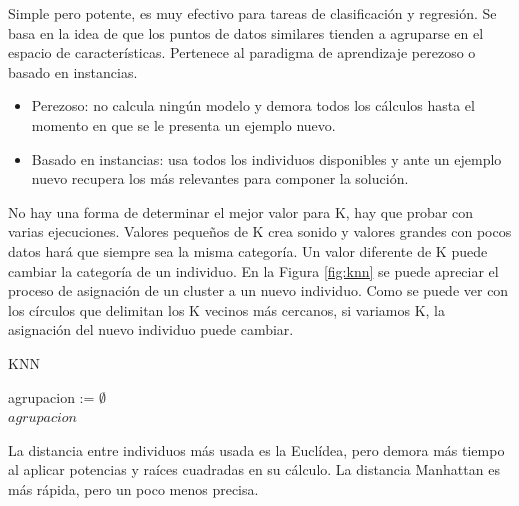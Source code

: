 		Simple pero potente, es muy efectivo para tareas de clasificación y regresión. Se basa en la idea de que los puntos de datos similares tienden a agruparse en el espacio de características. Pertenece al paradigma de aprendizaje perezoso o basado en instancias.
		
		\begin{itemize}
			\item Perezoso: no calcula ningún modelo y demora todos los cálculos hasta el momento en que se le presenta un ejemplo nuevo.			
			\item Basado en instancias: usa todos los individuos disponibles y ante un ejemplo nuevo recupera los más relevantes para componer la solución.	
		\end{itemize}
		
		No hay una forma de determinar el mejor valor para K, hay que probar con varias ejecuciones. Valores pequeños de K crea sonido y valores grandes con pocos datos hará que siempre sea la misma categoría. Un valor diferente de K puede cambiar la categoría de un individuo. En la Figura \ref{fig:knn} se puede apreciar el proceso de asignación de un cluster a un nuevo individuo. Como se puede ver con los círculos que delimitan los K vecinos más cercanos, si variamos K, la asignación del nuevo individuo puede cambiar.

		\begin{algorithm}
			\caption{KNN}
			agrupacion := $\emptyset$\\
			\Return $agrupacion$\;
		\end{algorithm}
		
		La distancia entre individuos más usada es la Euclídea, pero demora más tiempo al aplicar potencias y raíces cuadradas en su cálculo. La distancia Manhattan es más rápida, pero un poco menos precisa.



		
